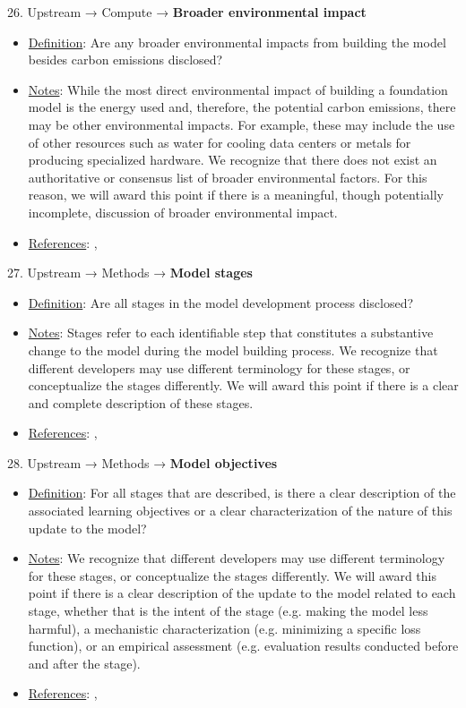 26. Upstream → Compute → \textbf{Broader environmental impact}
\vspace{-\parskip}
\begin{itemize}
	\item
	\underline{Definition}: Are any broader environmental impacts from building the model besides carbon emissions disclosed?
	\item
	\underline{Notes}: While the most direct environmental impact of building a foundation model is the energy used and, therefore, the potential carbon emissions, there may be other environmental impacts. For example, these may include the use of other resources such as water for cooling data centers or metals for producing specialized hardware. We recognize that there does not exist an authoritative or consensus list of broader environmental factors. For this reason, we will award this point if there is a meaningful, though potentially incomplete, discussion of broader environmental impact.
	\item
	\underline{References}: \citet{luccioni2023counting}, \citet{strubell2019energy}
\end{itemize}


27. Upstream → Methods → \textbf{Model stages}
\vspace{-\parskip}
\begin{itemize}
	\item
	\underline{Definition}: Are all stages in the model development process disclosed?
	\item
	\underline{Notes}: Stages refer to each identifiable step that constitutes a substantive change to the model during the model building process. We recognize that different developers may use different terminology for these stages, or conceptualize the stages differently. We will award this point if there is a clear and complete description of these stages.
	\item
	\underline{References}: \citet{mitchell2019model}, \citet{chung2022scaling}
\end{itemize}


28. Upstream → Methods → \textbf{Model objectives}
\vspace{-\parskip}
\begin{itemize}
	\item
	\underline{Definition}: For all stages that are described, is there a clear description of the associated learning objectives or a clear characterization of the nature of this update to the model?
	\item
	\underline{Notes}: We recognize that different developers may use different terminology for these stages, or conceptualize the stages differently. We will award this point if there is a clear description of the update to the model related to each stage, whether that is the intent of the stage (e.g. making the model less harmful), a mechanistic characterization (e.g. minimizing a specific loss function), or an empirical assessment (e.g. evaluation results conducted before and after the stage).
	\item
	\underline{References}: \citet{mitchell2019model}, \citet{chung2022scaling}
\end{itemize}


